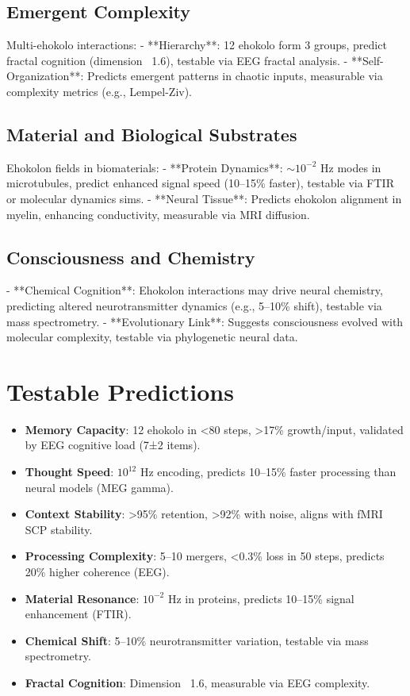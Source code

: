 \documentclass{article}
\begin{document}
\subsection{Emergent Complexity}
Multi-ehokolo interactions:
- **Hierarchy**: 12 ehokolo form 3 groups, predict fractal cognition (dimension ~1.6), testable via EEG fractal analysis.
- **Self-Organization**: Predicts emergent patterns in chaotic inputs, measurable via complexity metrics (e.g., Lempel-Ziv).

\subsection{Material and Biological Substrates}
Ehokolon fields in biomaterials:
- **Protein Dynamics**: $\sim 10^{-2}$ Hz modes in microtubules, predict enhanced signal speed (10–15\% faster), testable via FTIR or molecular dynamics sims.
- **Neural Tissue**: Predicts ehokolon alignment in myelin, enhancing conductivity, measurable via MRI diffusion.

\subsection{Consciousness and Chemistry}
- **Chemical Cognition**: Ehokolon interactions may drive neural chemistry, predicting altered neurotransmitter dynamics (e.g., 5–10\% shift), testable via mass spectrometry.
- **Evolutionary Link**: Suggests consciousness evolved with molecular complexity, testable via phylogenetic neural data.

\section{Testable Predictions}
\begin{itemize}
    \item \textbf{Memory Capacity}: 12 ehokolo in <80 steps, >17\% growth/input, validated by EEG cognitive load (7±2 items).
    \item \textbf{Thought Speed}: $10^{12}$ Hz encoding, predicts 10–15\% faster processing than neural models (MEG gamma).
    \item \textbf{Context Stability}: >95\% retention, >92\% with noise, aligns with fMRI SCP stability.
    \item \textbf{Processing Complexity}: 5–10 mergers, <0.3\% loss in 50 steps, predicts 20\% higher coherence (EEG).
    \item \textbf{Material Resonance}: $10^{-2}$ Hz in proteins, predicts 10–15\% signal enhancement (FTIR).
    \item \textbf{Chemical Shift}: 5–10\% neurotransmitter variation, testable via mass spectrometry.
    \item \textbf{Fractal Cognition}: Dimension ~1.6, measurable via EEG complexity.
\end{itemize}
\end{document}
